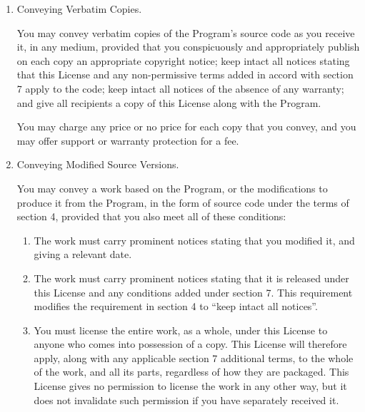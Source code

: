 \documentclass[11pt]{article}
\begin{document}
\begin{enumerate}
    \item Conveying Verbatim Copies.

          You may convey verbatim copies of the Program's source code as you
          receive it, in any medium, provided that you conspicuously and
          appropriately publish on each copy an appropriate copyright notice;
          keep intact all notices stating that this License and any
          non-permissive terms added in accord with section 7 apply to the code;
          keep intact all notices of the absence of any warranty; and give all
          recipients a copy of this License along with the Program.

          You may charge any price or no price for each copy that you convey,
          and you may offer support or warranty protection for a fee.

    \item Conveying Modified Source Versions.

          You may convey a work based on the Program, or the modifications to
          produce it from the Program, in the form of source code under the
          terms of section 4, provided that you also meet all of these conditions:
          \begin{enumerate}
              \item The work must carry prominent notices stating that you modified
                    it, and giving a relevant date.

              \item The work must carry prominent notices stating that it is
                    released under this License and any conditions added under section
                    7.  This requirement modifies the requirement in section 4 to
                    ``keep intact all notices''.

              \item You must license the entire work, as a whole, under this
                    License to anyone who comes into possession of a copy.  This
                    License will therefore apply, along with any applicable section 7
                    additional terms, to the whole of the work, and all its parts,
                    regardless of how they are packaged.  This License gives no
                    permission to license the work in any other way, but it does not
                    invalidate such permission if you have separately received it.


\end{enumerate}
\end{enumerate}
\end{document}
